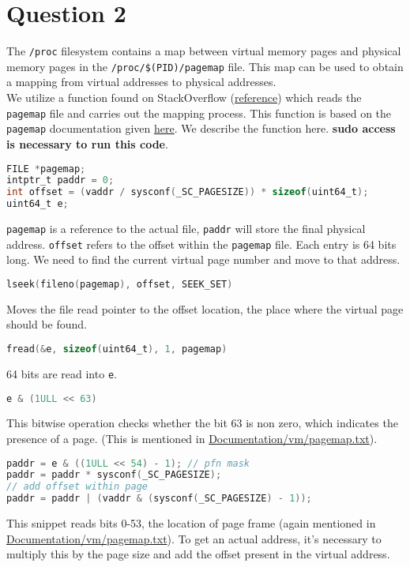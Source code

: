 \documentclass[a4paper,12pt]{article}
\begin{document}
\section{Question 2}
The \texttt{/proc} filesystem contains a map between virtual memory pages and physical memory pages in the \texttt{/proc/\$(PID)/pagemap} file. This map can be used to obtain a mapping from virtual addresses to physical addresses.\\
We utilize a function found on StackOverflow (\href{https://stackoverflow.com/questions/2440385/how-to-find-the-physical-address-of-a-variable-from-user-space-in-linux}{reference}) which reads the \texttt{pagemap} file and carries out the mapping process. This function is based on the \texttt{pagemap} documentation given \href{https://www.kernel.org/doc/Documentation/vm/pagemap.txt}{here}. We describe the function here. \textbf{sudo access is necessary to run this code}.
\begin{lstlisting}[language=C]
FILE *pagemap;
intptr_t paddr = 0;
int offset = (vaddr / sysconf(_SC_PAGESIZE)) * sizeof(uint64_t);
uint64_t e;
\end{lstlisting}
\texttt{pagemap} is a reference to the actual file, \texttt{paddr} will store the final physical address. \texttt{offset} refers to the offset within the \texttt{pagemap} file. Each entry is 64 bits long. We need to find the current virtual page number and move to that address.
\begin{lstlisting}[language=C]
lseek(fileno(pagemap), offset, SEEK_SET)
\end{lstlisting}
Moves the file read pointer to the offset location, the place where the virtual page should be found.
\begin{lstlisting}[language=C]
fread(&e, sizeof(uint64_t), 1, pagemap)
\end{lstlisting}
64 bits are read into \texttt{e}.
\begin{lstlisting}[language=C]
e & (1ULL << 63)
\end{lstlisting}
This bitwise operation checks whether the bit 63 is non zero, which indicates the presence of a page. (This is mentioned in \href{https://www.kernel.org/doc/Documentation/vm/pagemap.txt}{Documentation/vm/pagemap.txt}).
\begin{lstlisting}[language=C]
paddr = e & ((1ULL << 54) - 1); // pfn mask
paddr = paddr * sysconf(_SC_PAGESIZE);
// add offset within page
paddr = paddr | (vaddr & (sysconf(_SC_PAGESIZE) - 1));
\end{lstlisting}
This snippet reads bits 0-53, the location of page frame (again mentioned in \href{https://www.kernel.org/doc/Documentation/vm/pagemap.txt}{Documentation/vm/pagemap.txt}). To get an actual address, it's necessary to multiply this by the page size and add the offset present in the virtual address.
\end{document}

